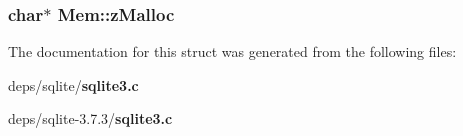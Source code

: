 \subsubsection{\setlength{\rightskip}{0pt plus 5cm}char$\ast$ \bf{Mem::z\-Malloc}}\label{structMem_fd3e60e9ad543d070d8c3ae8ec671586}




The documentation for this struct was generated from the following files:\begin{CompactItemize}
\item 
deps/sqlite/\bf{sqlite3.c}\item 
deps/sqlite-3.7.3/\bf{sqlite3.c}\end{CompactItemize}
